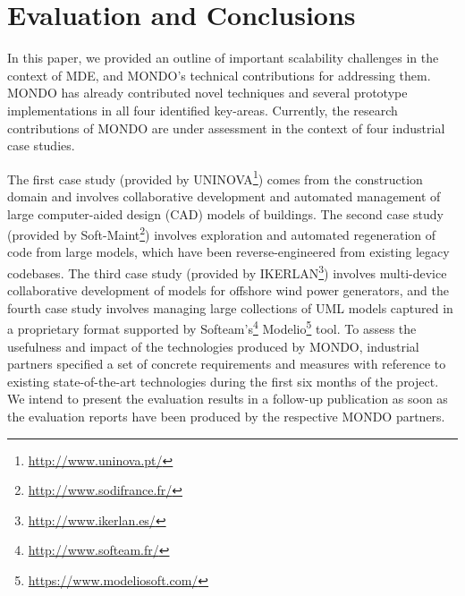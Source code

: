 \section{Evaluation and Conclusions}
\label{sec:conclusions}

In this paper, we provided an outline of important scalability challenges in the context of MDE, and MONDO's technical contributions for addressing them. MONDO has already contributed novel techniques and several prototype implementations in all four identified key-areas. Currently, the research contributions of MONDO are under assessment in the context of four industrial case studies. 

The first case study (provided by UNINOVA\footnote{\url{http://www.uninova.pt/}}) comes from the construction domain and involves collaborative development and automated management of large computer-aided design (CAD) models of buildings. The second case study (provided by Soft-Maint\footnote{\url{http://www.sodifrance.fr/}}) involves exploration and automated regeneration of code from large models, which have been reverse-engineered from existing legacy codebases. The third case study (provided by IKERLAN\footnote{\url{http://www.ikerlan.es/}}) involves multi-device collaborative development of models for offshore wind power generators, and the fourth case study involves managing large collections of UML models captured in a proprietary format supported by Softeam's\footnote{\url{http://www.softeam.fr/}} Modelio\footnote{\url{https://www.modeliosoft.com/}} tool. To assess the usefulness and impact of the technologies produced by MONDO, industrial partners specified a set of concrete requirements and measures with reference to existing state-of-the-art technologies during the first six months of the project. We intend to present the evaluation results in a follow-up publication as soon as the evaluation reports have been produced by the respective MONDO partners.


